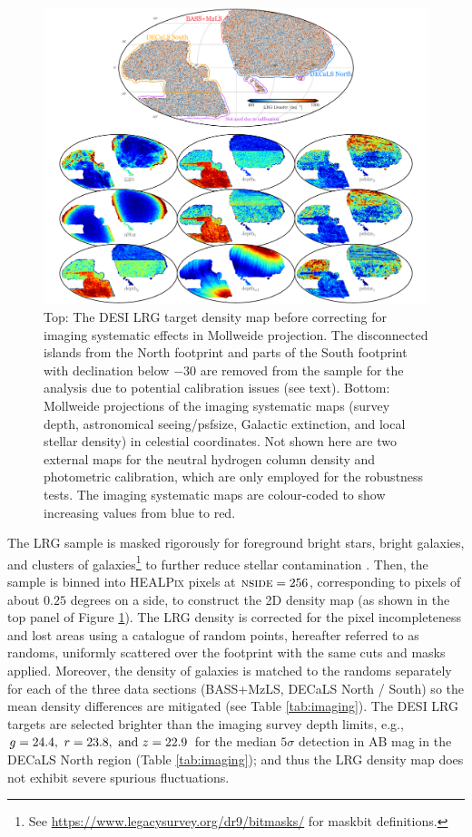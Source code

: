 \begin{figure}
 \centering
 \includegraphics[width=\textwidth]{figures/dr9data.pdf}
 \caption{Top: The DESI LRG target density map before correcting for imaging systematic effects in Mollweide projection. The disconnected islands from the North footprint and parts of the South footprint with declination below $-30$ are removed from the sample for the analysis due to potential calibration issues (see text). Bottom: Mollweide projections of the imaging systematic maps (survey depth, astronomical seeing/psfsize, Galactic extinction, and local stellar density) in celestial coordinates. Not shown here are two external maps for the neutral hydrogen column density and photometric calibration, which are only employed for the robustness tests. The imaging systematic maps are colour-coded to show increasing values from blue to red.}
 \label{fig:ng}
\end{figure}

The LRG sample is masked rigorously for foreground bright stars, bright galaxies, and clusters of galaxies\footnote{See \url{https://www.legacysurvey.org/dr9/bitmasks/} for maskbit definitions.} to further reduce stellar contamination \citep{zhou2022target}. Then, the sample is binned into \textsc{HEALPix} \citep{gorski2005healpix} pixels at $\textsc{nside}=256$, corresponding to pixels of about $0.25$ degrees on a side, to construct the 2D density map (as shown in the top panel of Figure \ref{fig:ng}). The LRG density is corrected for the pixel incompleteness and lost areas using a catalogue of random points, hereafter referred to as randoms, uniformly scattered over the footprint with the same cuts and masks applied. Moreover, the density of galaxies is matched to the randoms separately for each of the three data sections (BASS+MzLS, DECaLS North / South) so the mean density differences are mitigated (see Table \ref{tab:imaging}). The DESI LRG targets are selected brighter than the imaging survey depth limits, e.g., $g=24.4,~r=23.8,~{\rm and}~z=22.9$ for the median $5\sigma$ detection in AB mag in the DECaLS North region (Table \ref{tab:imaging}); and thus the LRG density map does not exhibit severe spurious fluctuations.

